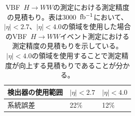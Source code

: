 \begin{table}[bpt]
\begin{center}
\caption[VBF~$H\rightarrow WW$の測定における測定精度の見積もり]{VBF~$H\rightarrow WW$の測定における測定精度の見積もり\cite{1-3}。表は3000~$\rm{fb^{-1}}$において、$|\eta| <2.7$、$|\eta| <4.0$の領域を使用した場合のVBF~$H\rightarrow WW$イベント測定における測定精度の見積もりを示している。$|\eta| <4.0$の領域を使用することで測定精度が向上する見積もりであることが分かる。}
\label{VBF_uncertainty}
  \begin{tabular}{|lll|} \hline
    検出器の使用範囲 & $|\eta| <2.7 $ & $|\eta| < 4.0 $ \\ \hline
    系統誤差 & 22$\%$ & 12$\%$ \\ \hline
  \end{tabular}
\end{center}
\end{table}

